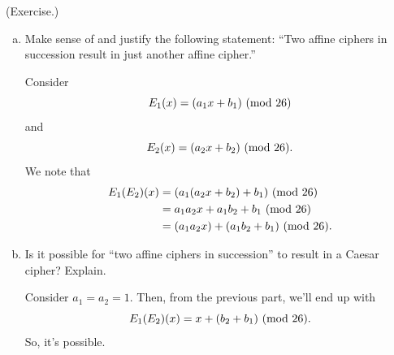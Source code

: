 \documentclass[letterpaper]{article}
\begin{document}
\begin{mdframed}
    (Exercise.)
    \begin{enumerate}[(a)]
        \item Make sense of and justify the following statement: ``Two affine ciphers in succession result in just another affine cipher.''
        \begin{mdframed}
            Consider \[E_{1}(x) = (a_1 x + b_1) \ (\mathrm{mod}\ 26)\] and \[E_{2}(x) = (a_2 x + b_2) \ (\mathrm{mod}\ 26).\] We note that 
            \begin{equation*}
                \begin{aligned}
                    E_{1}(E_{2})(x) &= (a_1 (a_2 x + b_2) + b_1) \ (\mathrm{mod}\ 26) \\ 
                        &= a_1 a_2 x + a_1 b_2 + b_1 \ (\mathrm{mod}\ 26) \\ 
                        &= (a_1 a_2 x) + (a_1 b_2 + b_1)  \ (\mathrm{mod}\ 26).
                \end{aligned}
            \end{equation*}
        \end{mdframed}

        \item Is it possible for ``two affine ciphers in succession'' to result in a Caesar cipher? Explain.
        \begin{mdframed}
            Consider $a_1 = a_2 = 1$. Then, from the previous part, we'll end up with 
            \[E_{1}(E_{2})(x) = x + (b_2 + b_1) \ (\mathrm{mod}\ 26).\]
            So, it's possible. 
        \end{mdframed}
    \end{enumerate}
\end{mdframed}
\end{document}
